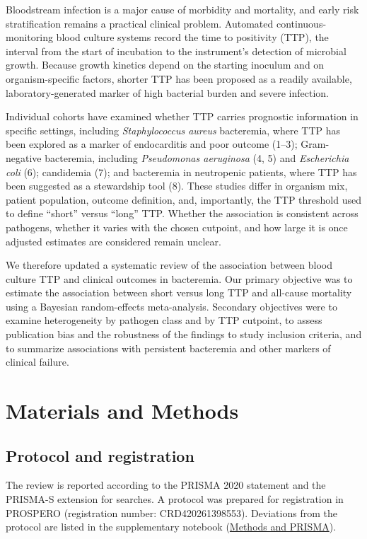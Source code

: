 \documentclass[
  11pt,
]{article}
\begin{document}
Bloodstream infection is a major cause of morbidity and mortality, and
early risk stratification remains a practical clinical problem.
Automated continuous-monitoring blood culture systems record the time to
positivity (TTP), the interval from the start of incubation to the
instrument's detection of microbial growth. Because growth kinetics
depend on the starting inoculum and on organism-specific factors,
shorter TTP has been proposed as a readily available,
laboratory-generated marker of high bacterial burden and severe
infection.

Individual cohorts have examined whether TTP carries prognostic
information in specific settings, including \emph{Staphylococcus aureus}
bacteremia, where TTP has been explored as a marker of endocarditis and
poor outcome (1--3); Gram-negative bacteremia, including
\emph{Pseudomonas aeruginosa} (4, 5) and \emph{Escherichia coli} (6);
candidemia (7); and bacteremia in neutropenic patients, where TTP has
been suggested as a stewardship tool (8). These studies differ in
organism mix, patient population, outcome definition, and, importantly,
the TTP threshold used to define ``short'' versus ``long'' TTP. Whether
the association is consistent across pathogens, whether it varies with
the chosen cutpoint, and how large it is once adjusted estimates are
considered remain unclear.

We therefore updated a systematic review of the association between
blood culture TTP and clinical outcomes in bacteremia. Our primary
objective was to estimate the association between short versus long TTP
and all-cause mortality using a Bayesian random-effects meta-analysis.
Secondary objectives were to examine heterogeneity by pathogen class and
by TTP cutpoint, to assess publication bias and the robustness of the
findings to study inclusion criteria, and to summarize associations with
persistent bacteremia and other markers of clinical failure.

\section{Materials and Methods}\label{materials-and-methods}

\subsection{Protocol and registration}\label{protocol-and-registration}

The review is reported according to the PRISMA 2020 statement and the
PRISMA-S extension for searches. A protocol was prepared for
registration in PROSPERO (registration number: CRD420261398553).
Deviations from the protocol are listed in the supplementary notebook
(\href{notebooks/methods.qmd}{Methods and PRISMA}).
\end{document}
